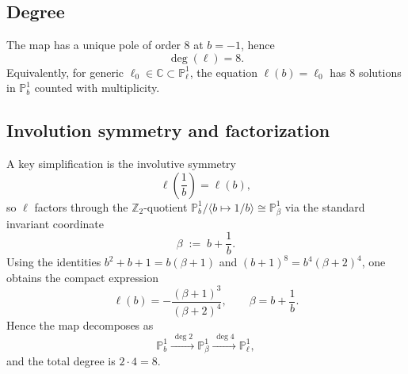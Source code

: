 \documentclass[11pt, a4paper]{article}
\newcommand{\PP}{\mathbb{P}}
\newcommand{\CC}{\mathbb{C}}
\newcommand{\ZZ}{\mathbb{Z}}
\numberwithin{equation}{section}
\begin{document}
\subsection{Degree}
The map has a unique pole of order $8$ at $b=-1$, hence
\begin{equation}
  \deg(\ell)=8.
\end{equation}
Equivalently, for generic $\ell_0\in\CC\subset\PP^1_\ell$, the equation $\ell(b)=\ell_0$ has $8$ solutions in $\PP^1_b$ counted with multiplicity.

\subsection{Involution symmetry and factorization}
A key simplification is the involutive symmetry
\begin{equation}
  \ell\!\left(\frac{1}{b}\right)=\ell(b),
\end{equation}
so $\ell$ factors through the $\ZZ_2$-quotient $\PP^1_b/\langle b\mapsto 1/b\rangle\cong\PP^1_\beta$ via the standard invariant coordinate
\begin{equation}
  \beta \;:=\; b+\frac{1}{b}.
\end{equation}
Using the identities $b^2+b+1=b(\beta+1)$ and $(b+1)^8=b^4(\beta+2)^4$, one obtains the compact expression
\begin{equation}\label{eq:l-of-u}
  \ell(b)= -\frac{(\beta+1)^3}{(\beta+2)^4},
  \qquad \beta=b+\frac{1}{b}.
\end{equation}
Hence the map decomposes as
\begin{equation}
  \PP^1_b \xrightarrow{\ \deg 2\ } \PP^1_\beta \xrightarrow{\ \deg 4\ } \PP^1_\ell,
\end{equation}
and the total degree is $2\cdot 4=8$.
\end{document}
